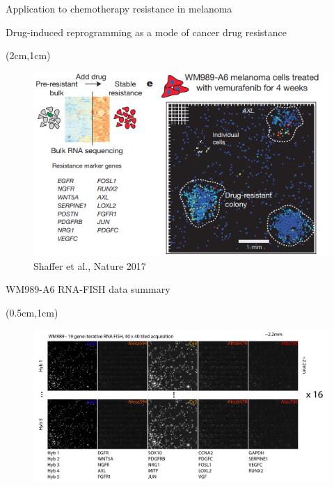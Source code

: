 \documentclass[aspectratio=1610]{beamer}					%
\begin{document}
\begin{section}{Application to chemotherapy resistance in melanoma}
\begin{frame}{Drug-induced
reprogramming as a mode of cancer drug resistance}

\begin{textblock*}{12cm}(2cm,1cm)
\begin{figure}
\includegraphics[width=12cm]{resistance.png}
\caption{Shaffer et al., Nature 2017}
\end{figure}
\end{textblock*}

\end{frame}


\begin{frame}{WM989-A6 RNA-FISH data summary}

\begin{textblock*}{15cm}(0.5cm,1cm)
\begin{figure}
\includegraphics[width=15cm]{data-summary.png}
\end{figure}
\end{textblock*}

\end{frame}


\end{section}
\end{document}

